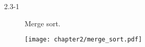 \begin{description}
 \item[2.3-1] Merge sort.
 \begin{center}
 \texttt{[image: chapter2/merge\_sort.pdf]}
\end{center}


\end{description}

